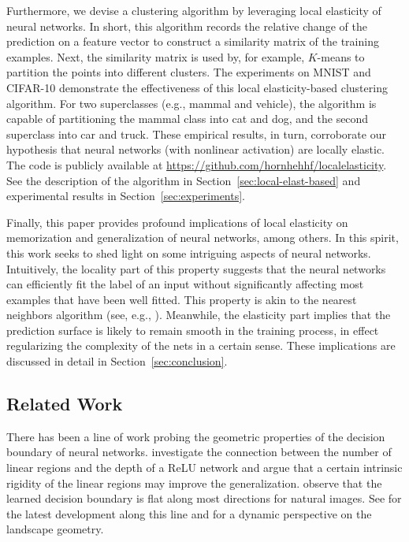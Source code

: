 Furthermore, we devise a clustering algorithm by leveraging local elasticity of neural networks. In short, this algorithm records the relative change of the prediction on a feature vector to construct a similarity matrix of the training examples. Next, the similarity matrix is used by, for example, $K$-means to partition the points into different clusters. The experiments on MNIST \citep{lecun1998mnist} and CIFAR-10 \citep{krizhevsky2009learning} demonstrate the effectiveness of this local elasticity-based clustering algorithm. For two superclasses (e.g., mammal and vehicle), the algorithm is capable of partitioning the mammal class into cat and dog, and the second superclass into car and truck. These empirical results, in turn, corroborate our hypothesis that neural networks (with
nonlinear activation) are locally elastic. The code is publicly available at \url{https://github.com/hornhehhf/localelasticity}. See the description of the algorithm in Section~\ref{sec:local-elast-based} and experimental results in Section~\ref{sec:experiments}.


Finally, this paper provides profound implications of local elasticity on memorization and generalization of neural networks, among others.  In this spirit, this work seeks to shed light on some intriguing aspects of neural networks. Intuitively, the locality part of this property suggests that the neural networks can efficiently fit the label of an input without significantly affecting most examples that have been well fitted. This property is akin to the nearest neighbors algorithm (see, e.g., \citet{papernot2018deep}). Meanwhile, the elasticity part implies that the prediction surface is likely to remain smooth in the training process, in effect regularizing the complexity of the nets in a certain sense. These implications are discussed in detail in Section~\ref{sec:conclusion}.


\subsection{Related Work}

There has been a line of work probing the geometric properties of the decision boundary of neural networks. \cite{montufar2014number} investigate the connection between the number of linear regions and the depth of a ReLU network and argue that a certain intrinsic rigidity of the linear regions may improve the generalization. \cite{fawzi2017classification,fawzi2018empirical} observe that the learned decision boundary is flat along most directions for natural images. See \cite{hanin2019complexity} for the latest development along this line and \cite{fort2019stiffness} for a dynamic perspective on the landscape geometry.

